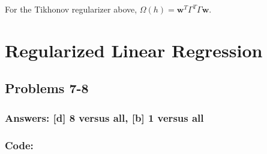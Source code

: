 \documentclass[11pt]{article}
\begin{document}
For the Tikhonov regularizer above,
\(\Omega(h)=\mathbf{w}^T\Gamma^T\Gamma\mathbf{w}\).

    \hypertarget{regularized-linear-regression}{%
\section{Regularized Linear
Regression}\label{regularized-linear-regression}}

\hypertarget{problems-7-8}{%
\subsection{Problems 7-8}\label{problems-7-8}}

\hypertarget{answers-d-8-versus-all-b-1-versus-all}{%
\subsubsection{Answers: {[}d{]} 8 versus all, {[}b{]} 1 versus
all}\label{answers-d-8-versus-all-b-1-versus-all}}

\hypertarget{code}{%
\subsubsection{Code:}\label{code}}
\end{document}
